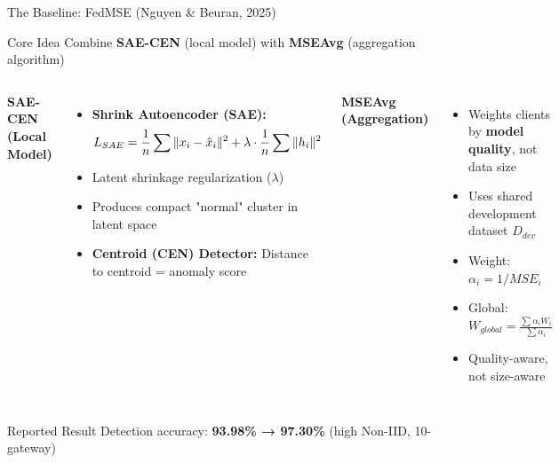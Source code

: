 \documentclass[10pt, aspectratio=169]{beamer}
\begin{document}
\begin{frame}{The Baseline: FedMSE (Nguyen \& Beuran, 2025)}
    \begin{block}{Core Idea}
        Combine \textbf{SAE-CEN} (local model) with \textbf{MSEAvg} (aggregation algorithm)
    \end{block}
    
    \begin{columns}
        \textbf{SAE-CEN (Local Model)}
        \begin{itemize}
            \item \textbf{Shrink Autoencoder (SAE):}
            \begin{equation*}
            \small
            L_{SAE} = \frac{1}{n}\sum\|x_i - \hat{x}_i\|^2 + \lambda\cdot\frac{1}{n}\sum\|h_i\|^2
            \end{equation*}
            \item Latent shrinkage regularization ($\lambda$)
            \item Produces compact "normal" cluster in latent space
            \item \textbf{Centroid (CEN) Detector:} Distance to centroid = anomaly score
        \end{itemize}
        
        \textbf{MSEAvg (Aggregation)}
        \begin{itemize}
            \item Weights clients by \textbf{model quality}, not data size
            \item Uses shared development dataset $D_{dev}$
            \item Weight: $\alpha_i = 1 / MSE_i$
            \item Global: $W_{global} = \frac{\sum \alpha_i W_i}{\sum \alpha_i}$
            \item Quality-aware, not size-aware
        \end{itemize}
    \end{columns}
    
    \vspace{0.3cm}
    \begin{alertblock}{Reported Result}
        Detection accuracy: \textbf{93.98\% → 97.30\%} (high Non-IID, 10-gateway)
    \end{alertblock}
\end{frame}
\end{document}
